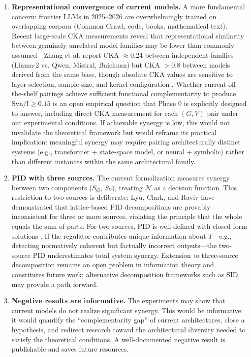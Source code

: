 \documentclass[11pt,a4paper]{article}
\theoremstyle{remark}
\newcommand{\Syn}{\mathrm{Syn}}
\newcommand{\MI}{\mathrm{I}}
\begin{document}
\begin{enumerate}
  \item \textbf{Representational convergence of current models.} A more fundamental concern: frontier LLMs in 2025--2026 are overwhelmingly trained on overlapping corpora (Common Crawl, code, books, mathematical text). Recent large-scale CKA measurements reveal that representational similarity between genuinely unrelated model families may be lower than commonly assumed---Zhang et al. \cite{zhang2025reef} report CKA $\approx 0.24$ between independent families (Llama-2 vs. Qwen, Mistral, Baichuan) but CKA $> 0.8$ between models derived from the same base, though absolute CKA values are sensitive to layer selection, sample size, and kernel configuration \cite{davari2022cka}. Whether current off-the-shelf pairings achieve sufficient functional complementarity to produce $\Syn/\MI \geq 0.15$ is an open empirical question that Phase 0 is explicitly designed to answer, including direct CKA measurement for each $(G, V)$ pair under our experimental conditions. If achievable synergy is low, this would not invalidate the theoretical framework but would reframe its practical implication: meaningful synergy may require pairing architecturally distinct systems (e.g., transformer + state-space model, or neural + symbolic) rather than different instances within the same architectural family.
  
  \item \textbf{PID with three sources.} The current formalization measures synergy between two components ($S_G$, $S_V$), treating $\mathcal{N}$ as a decision function. This restriction to two sources is deliberate: Lyu, Clark, and Raviv \cite{lyu2025pid} have demonstrated that lattice-based PID decompositions are provably inconsistent for three or more sources, violating the principle that the whole equals the sum of parts. For two sources, PID is well-defined with closed-form solutions \cite{williams2010pid,bertschinger2014pid}. If the regulator contributes unique information about $T$---e.g., detecting normatively coherent but factually incorrect outputs---the two-source PID underestimates total system synergy. Extension to three-source decomposition remains an open problem in information theory and constitutes future work; alternative decomposition frameworks such as SID \cite{lyu2025pid} may provide a path forward.
  
  \item \textbf{Negative results are informative.} The experiments may show that current models do not realize significant synergy. This would be informative: it would quantify the ``complementarity gap'' of current architectures, close a hypothesis, and redirect research toward the architectural diversity needed to satisfy the theoretical conditions. A well-documented negative result is publishable and saves future resources.
\end{enumerate}
\end{document}
